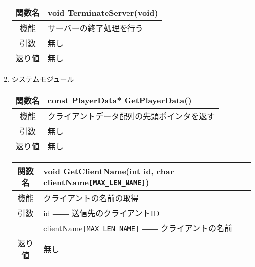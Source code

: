 \documentclass{jarticle}
\begin{document}
\begin{enumerate}
\begin{table}[H]
    \end{table}
    \begin{table}[H]
        \label{table:fanc_s1-5}
        \begin{center}
            \begin{tabular}{|c||p{30em}|}\hline
                関数名&void TerminateServer(void)  \\\hline
                機能&サーバーの終了処理を行う\\
                引数&無し\\
                返り値&無し\\\hline
            \end{tabular}
        \end{center}
    \end{table}
    \item システムモジュール
    \begin{table}[H]
        \label{table:fanc_s2-1}
        \begin{center}
            \begin{tabular}{|c||p{30em}|}\hline
                関数名&const PlayerData* GetPlayerData()\\\hline
                機能&クライアントデータ配列の先頭ポインタを返す\\
                引数&無し\\
                返り値&無し\\\hline

            \end{tabular}
        \end{center}
    \end{table}
    \begin{table}[H]
        \label{table:fanc_s2-2}
        \begin{center}
            \begin{tabular}{|c||p{30em}|}\hline
                関数名&void GetClientName(int id, char clientName\verb+[MAX_LEN_NAME]+)\\\hline
                機能&クライアントの名前の取得\\
                引数&id ―― 送信先のクライアントID\\
                &clientName\verb+[MAX_LEN_NAME]+ ―― クライアントの名前\\
                返り値&無し\\\hline


\end{tabular}
\end{center}
\end{table}
\end{enumerate}
\end{document}
